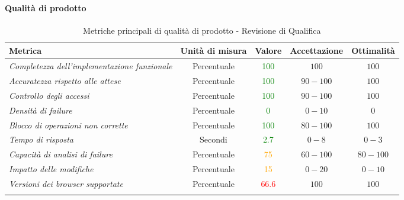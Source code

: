 \paragraph{Qualità di prodotto}
\begin{longtable}{|>{\centering}m{5cm}|c|c|c|c|}
\hline
\textbf{Metrica} & \textbf{Unità di misura} & \textbf{Valore} & \textbf{Accettazione} & \textbf{Ottimalità}\\
\hline
\endhead
\emph{Completezza dell'implementazione funzionale} & {Percentuale} & \textcolor{Green}{100} & $100$ & $100$\\ \hline
\emph{Accuratezza rispetto alle attese} & {Percentuale} & \textcolor{Green}{100} & $90 - 100$ & $100$\\ \hline
\emph{Controllo degli accessi} & {Percentuale} & \textcolor{Green}{100} & $90 - 100$ & $100$\\ \hline
\emph{Densità di failure} & {Percentuale} & \textcolor{Green}{0} & $0 - 10$  & $0$\\ \hline
\emph{Blocco di operazioni non corrette} & {Percentuale} & \textcolor{Green}{100} & $80 - 100$  & $100$\\ \hline
\emph{Tempo di risposta} & {Secondi} & \textcolor{Green}{2.7} & $0 - 8$ & $0 - 3$\\ \hline
\emph{Capacità di analisi di failure} & {Percentuale} & \textcolor{Orange}{75} & $60 - 100$ & $80 - 100$\\ \hline
\emph{Impatto delle modifiche} & {Percentuale} & \textcolor{Orange}{15} & $0 - 20$ & $0 - 10$\\ \hline
\emph{Versioni dei browser supportate} & {Percentuale} & \textcolor{Red}{66.6} & $100$ & $100$\\ \hline
\caption{Metriche principali di qualità di prodotto - Revisione di Qualifica}
\end{longtable}

\newpage
